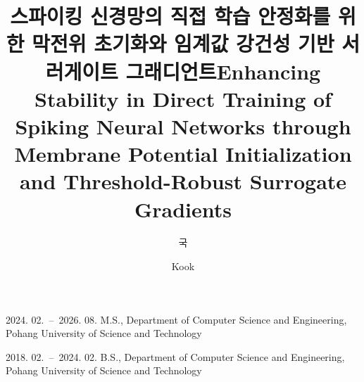 \documentclass[master,english,final]{postech-ucs}
\title[korean]{스파이킹 신경망의 직접 학습 안정화를 위한 막전위 초기화와 임계값 강건성 기반 서러게이트 그래디언트}
\title[english]{Enhancing Stability in Direct Training of Spiking Neural Networks through Membrane Potential Initialization and Threshold-Robust Surrogate Gradients}
\author[korean]{국}{현 호}
\author[english]{Kook}{Hyunho}
\begin{document}

    \begin{abstract}
        
    \end{abstract}


    \tableofcontents

    \listoffigures

    \listoftables

    
    
    
    
    
    
    

    \begin{summarykorean}
        
    \end{summarykorean}

    
    

    \acknowledgement[english]
    

    \curriculumvitae[english]

        \begin{personaldata}
        \end{personaldata}

        \begin{education}
            \item[2024. 02.\ --\ 2026. 08.] M.S., Department of Computer Science and Engineering, Pohang University of Science and Technology
            \item[2018. 02.\ --\ 2024. 02.] B.S., Department of Computer Science and Engineering, Pohang University of Science and Technology
        \end{education}
\end{document}

